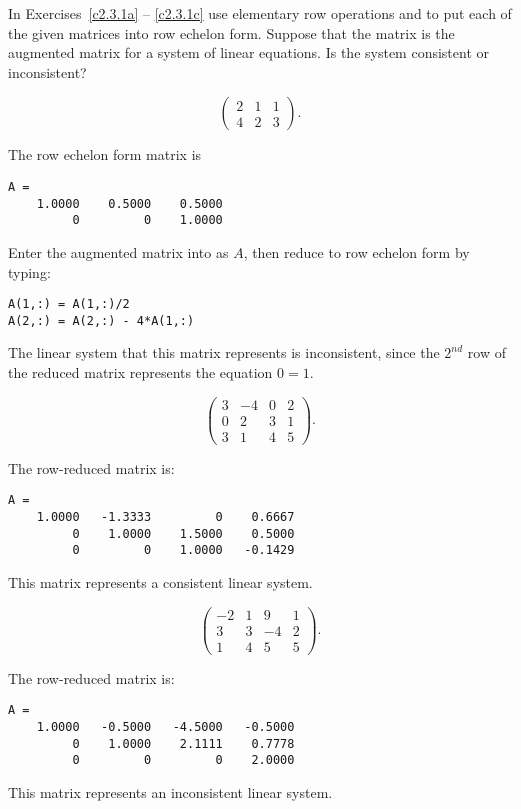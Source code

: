 \documentclass{ximera}
\begin{document}
\CEXER



\noindent In Exercises~\ref{c2.3.1a} -- \ref{c2.3.1c} use elementary row
operations and \Matlab to put each of the given matrices into row echelon
form.  Suppose that the matrix is the augmented matrix for a system of
linear equations.  Is the system consistent or inconsistent?

\begin{exercise} \label{c2.3.1a}
\[
\left(\begin{array}{rrr}
 2 &  1  &  1   \\
 4 &  2  &  3
\end{array}\right).
\]

\begin{solution}
\ans The row echelon form matrix is
\begin{verbatim}
A = 
    1.0000    0.5000    0.5000
         0         0    1.0000
\end{verbatim}
\soln Enter the augmented matrix into \Matlab as $A$, then reduce to
row echelon form by typing:
\begin{verbatim}
A(1,:) = A(1,:)/2
A(2,:) = A(2,:) - 4*A(1,:)
\end{verbatim}
The linear system that this matrix represents is inconsistent, since
the $2^{nd}$ row of the reduced matrix represents the equation $0 = 1$.

\end{solution}
\end{exercise}
\begin{exercise} \label{c2.3.1b}
\[
\left(\begin{array}{rrrr}
 3  & -4 & 0 & 2\\
 0  &  2 & 3 & 1\\
 3  &  1 & 4 & 5
\end{array}\right).
\]

\begin{solution}
The row-reduced matrix is:
\begin{verbatim}
A =
    1.0000   -1.3333         0    0.6667
         0    1.0000    1.5000    0.5000
         0         0    1.0000   -0.1429
\end{verbatim}
This matrix represents a consistent linear system.

\end{solution}
\end{exercise}
\begin{exercise} \label{c2.3.1c}
\[
\left(\begin{array}{rrrr}
 -2 & 1 &  9 & 1\\
  3 & 3 & -4 & 2\\
  1 & 4 &  5 & 5
\end{array}\right).
\]

\begin{solution}
The row-reduced matrix is:
\begin{verbatim}
A =
    1.0000   -0.5000   -4.5000   -0.5000
         0    1.0000    2.1111    0.7778
         0         0         0    2.0000
\end{verbatim}
This matrix represents an inconsistent linear system.


\end{solution}
\end{exercise}
\end{document}
